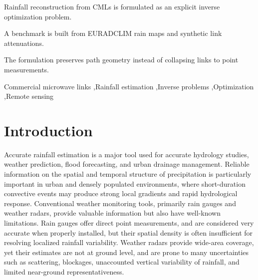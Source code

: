 \documentclass[a4paper,fleqn]{cas-sc}
\begin{document}
\begin{highlights}
  \item Rainfall reconstruction from CMLs is formulated as an explicit inverse optimization problem.
  \item A benchmark is built from EURADCLIM rain maps and synthetic link attenuations.
  \item The formulation preserves path geometry instead of collapsing links to point measurements.
\end{highlights}

\begin{keywords}
  Commercial microwave links \sep Rainfall estimation \sep Inverse problems \sep Optimization \sep Remote sensing
\end{keywords}

\maketitle

\section{Introduction}

Accurate rainfall estimation is a major tool used for accurate hydrology studies, weather prediction, flood forecasting, and urban drainage management. Reliable information on the spatial and temporal structure of precipitation is particularly important in urban and densely populated environments, where short-duration convective events may produce strong local gradients and rapid hydrological response. Conventional weather monitoring tools, primarily rain gauges and weather radars, provide valuable information but also have well-known limitations. Rain gauges offer direct point measurements, and are considered very accurate when properly installed, but their spatial density is often insufficient for resolving localized rainfall variability. Weather radars provide wide-area coverage, yet their estimates are not at ground level, and are prone to many uncertainties such as scattering, blockages, unaccounted vertical variability of rainfall, and limited near-ground representativeness.
\end{document}
